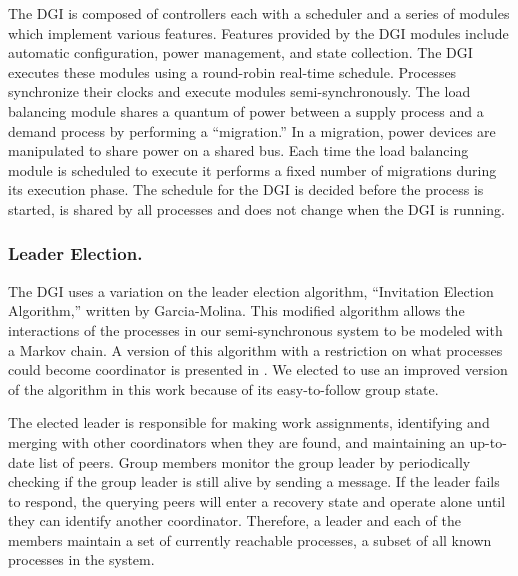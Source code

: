 The DGI is composed of controllers each with a scheduler and a series of modules which implement various features.
Features provided by the DGI modules include automatic configuration, power management, and state collection.
The \ac{DGI} executes these modules using a round-robin real-time schedule.
Processes synchronize their clocks and execute modules semi-synchronously.
The load balancing module shares a quantum of power between a supply process and a demand process by performing a ``migration.''
In a migration, power devices are manipulated to share power on a shared bus.
Each time the load balancing module is scheduled to execute it performs a fixed number of migrations during its execution phase.
The schedule for the \ac{DGI} is decided before the process is started, is shared by all processes and does not change when the \ac{DGI} is running.


\subsubsection{Leader Election.}

The \ac{DGI} uses a variation on the leader election algorithm, ``Invitation Election Algorithm,'' written by Garcia-Molina\cite{INVITATIONELECTION}.
This modified algorithm allows the interactions of the processes in our semi-synchronous system to be modeled with a Markov chain.
A version of this algorithm with a restriction on what processes could become coordinator is presented in \cite{JOURNAL}.
We elected to use an improved version of the algorithm in this work because of its easy-to-follow group state.

The elected leader is responsible for making work assignments, identifying and merging with other coordinators when they are found, and maintaining an up-to-date list of peers.
Group members monitor the group leader by periodically checking if the group leader is still alive by sending a message.
If the leader fails to respond, the querying peers will enter a recovery state and operate alone until they can identify another coordinator.
Therefore, a leader and each of the members maintain a set of currently reachable processes, a subset of all known processes in the system.

